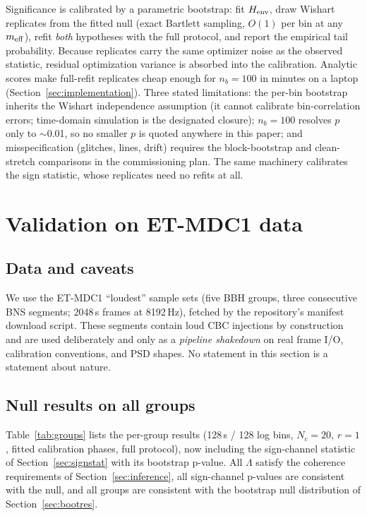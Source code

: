 \documentclass[11pt]{article}
\begin{document}
Significance is calibrated by a parametric bootstrap: fit $H_{\rm env}$, draw Wishart replicates from the fitted null (exact Bartlett sampling, $O(1)$ per bin at any $m_{\rm eff}$), refit \emph{both} hypotheses with the full protocol, and report the empirical tail probability. Because replicates carry the same optimizer noise as the observed statistic, residual optimization variance is absorbed into the calibration. Analytic scores make full-refit replicates cheap enough for $n_b = 100$ in minutes on a laptop (Section~\ref{sec:implementation}). Three stated limitations: the per-bin bootstrap inherits the Wishart independence assumption (it cannot calibrate bin-correlation errors; time-domain simulation is the designated closure); $n_b = 100$ resolves $p$ only to $\sim$0.01, so no smaller $p$ is quoted anywhere in this paper; and misspecification (glitches, lines, drift) requires the block-bootstrap and clean-stretch comparisons in the commissioning plan. The same machinery calibrates the sign statistic, whose replicates need no refits at all.

\section{Validation on ET-MDC1 data}
\label{sec:results}

\subsection{Data and caveats}
We use the ET-MDC1 ``loudest'' sample sets (five BBH groups, three consecutive BNS segments; 2048\,s frames at 8192\,Hz), fetched by the repository's manifest download script. These segments contain loud CBC injections by construction and are used deliberately and only as a \emph{pipeline shakedown} on real frame I/O, calibration conventions, and PSD shapes. No statement in this section is a statement about nature.

\subsection{Null results on all groups}
\label{sec:nullresults}

Table~\ref{tab:groups} lists the per-group results (128\,s / 128 log bins, $N_c = 20$, $r=1$, fitted calibration phases, full protocol), now including the sign-channel statistic of Section~\ref{sec:signstat} with its bootstrap p-value. All $\Lambda$ satisfy the coherence requirements of Section~\ref{sec:inference}, all sign-channel p-values are consistent with the null, and all groups are consistent with the bootstrap null distribution of Section~\ref{sec:bootres}.
\end{document}
